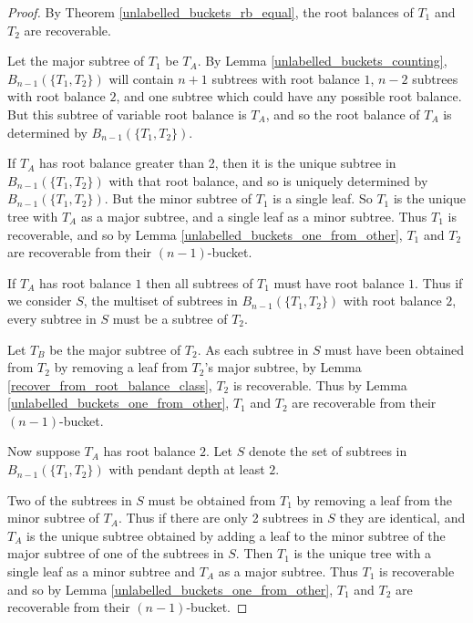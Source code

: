 \documentclass[12pt]{article}
\theoremstyle{definition}
\begin{document}
\begin{proof}
    By Theorem \ref{unlabelled_buckets_rb_equal}, the root balances of $T_1$ and $T_2$ are recoverable.

    Let the major subtree of $T_1$ be $T_A$. By Lemma \ref{unlabelled_buckets_counting}, $B_{n-1}(\{T_1, T_2\})$ will contain $n + 1$ subtrees with root balance $1$, $n - 2$ subtrees with root balance $2$, and one subtree which could have any possible root balance. But this subtree of variable root balance is $T_A$, and so the root balance of $T_A$ is determined by $B_{n-1}(\{T_1, T_2\})$.
    
    If $T_A$ has root balance greater than 2, then it is the unique subtree in $B_{n-1}(\{T_1, T_2\})$ with that root balance, and so is uniquely determined by $B_{n-1}(\{T_1, T_2\})$. But the minor subtree of $T_1$ is a single leaf. So $T_1$ is the unique tree with $T_A$ as a major subtree, and a single leaf as a minor subtree. Thus $T_1$ is recoverable, and so by Lemma \ref{unlabelled_buckets_one_from_other}, $T_1$ and $T_2$ are recoverable from their $(n-1)$-bucket.
    
    If $T_A$ has root balance $1$ then all subtrees of $T_1$ must have root balance $1$. Thus if we consider $S$, the multiset of subtrees in $B_{n-1}(\{T_1, T_2\})$ with root balance $2$, every subtree in $S$ must be a subtree of $T_2$. 
    
    Let $T_B$ be the major subtree of $T_2$. As each subtree in $S$ must have been obtained from $T_2$ by removing a leaf from $T_2$'s major subtree,     by Lemma \ref{recover_from_root_balance_class}, $T_2$ is recoverable. Thus by Lemma \ref{unlabelled_buckets_one_from_other}, $T_1$ and $T_2$ are recoverable from their $(n-1)$-bucket.
    
    
    
    Now suppose $T_A$ has root balance $2$. Let $S$ denote the set of subtrees in $B_{n-1}(\{T_1, T_2\})$ with pendant depth at least $2$.
    
    Two of the subtrees in $S$ must be obtained from $T_1$ by removing a leaf from the minor subtree of $T_A$. Thus if there are only 2 subtrees in $S$ they are identical, and $T_A$ is the unique subtree obtained by adding a leaf to the minor subtree of the major subtree of one of the subtrees in $S$. Then $T_1$ is the unique tree with a single leaf as a minor subtree and $T_A$ as a major subtree. Thus $T_1$ is recoverable and so by Lemma \ref{unlabelled_buckets_one_from_other}, $T_1$ and $T_2$ are recoverable from their $(n-1)$-bucket.
    

\end{proof}
\end{document}
